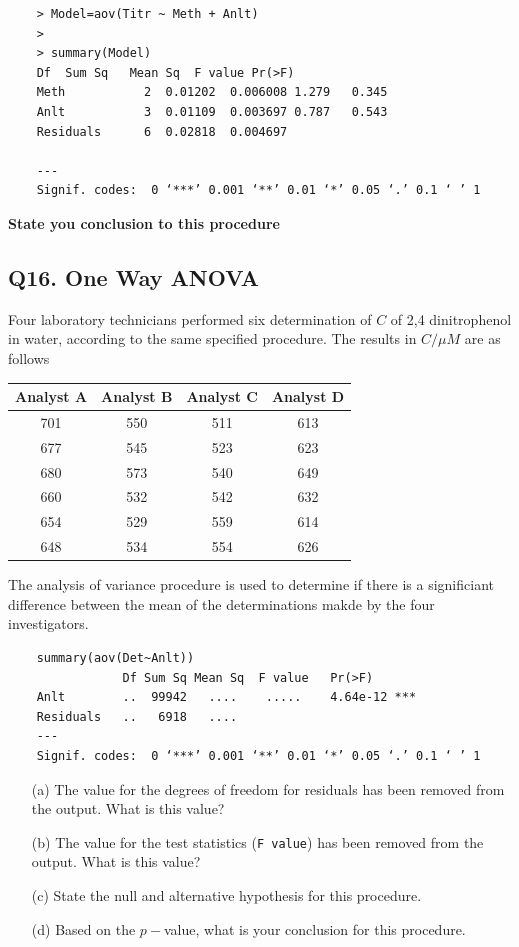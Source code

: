 \documentclass[a4paper,12pt]{article}
\begin{document}
\begin{framed}
	\begin{verbatim}
	> Model=aov(Titr ~ Meth + Anlt) 
	> 
	> summary(Model) 
	Df  Sum Sq   Mean Sq  F value Pr(>F)    
	Meth           2  0.01202  0.006008 1.279   0.345  
	Anlt           3  0.01109  0.003697 0.787   0.543  
	Residuals      6  0.02818  0.004697   
	
	---
	Signif. codes:  0 ‘***’ 0.001 ‘**’ 0.01 ‘*’ 0.05 ‘.’ 0.1 ‘ ’ 1
	\end{verbatim}
\end{framed}

\textbf{State you conclusion to this procedure}
\subsection*{Q16. One Way ANOVA } 
Four laboratory technicians performed six determination of $C$ of 2,4 dinitrophenol in water, according to the same specified procedure.
The results in $C/ \mu M$ are as follows

\begin{center}
	\begin{tabular}{|c|c|c|c|}
		\hline Analyst A	&	Analyst B	&	Analyst C	&	Analyst D	\\ \hline
		701	&	550	&	511	&	613	\\ \hline
		677	&	545	&	523	&	623	\\ \hline
		680	&	573	&	540	&	649	\\ \hline
		660	&	532	&	542	&	632	\\ \hline
		654	&	529	&	559	&	614	\\ \hline
		648	&	534	&	554	&	626	\\ \hline
	\end{tabular} 
\end{center}
The analysis of variance procedure is used to determine
if there is a significiant difference between the mean of the
determinations makde by the four investigators.


\begin{framed}
	\begin{verbatim}
	summary(aov(Det~Anlt))
	            Df Sum Sq Mean Sq  F value   Pr(>F)    
	Anlt        ..  99942   ....    .....    4.64e-12 ***
	Residuals   ..   6918   ....                     
	---
	Signif. codes:  0 ‘***’ 0.001 ‘**’ 0.01 ‘*’ 0.05 ‘.’ 0.1 ‘ ’ 1
	\end{verbatim}
\end{framed}

\begin{itemize}
	\item[(a)] The value for the degrees of freedom for residuals has been removed from the output. What is this value?
	\item[(b)] The value for the test statistics (\texttt{F value}) has been removed from the output. What is this value?
	\item[(c)] State the null and alternative hypothesis for this procedure.
	\item[(d)] Based on the $p-$value, what is your conclusion for this procedure.
\end{itemize}
\end{document}
